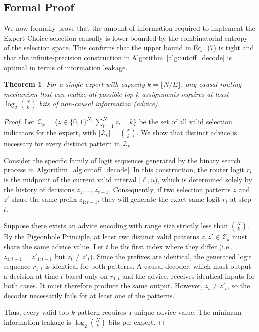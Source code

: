 \documentclass{article}
\theoremstyle{plain}
\newtheorem{theorem}{Theorem}[section]
\theoremstyle{definition}
\theoremstyle{remark}
\begin{document}
\subsection{Formal Proof}

We now formally prove that the amount of information required to implement the Expert Choice selection causally is lower-bounded by the combinatorial entropy of the selection space. This confirms that the upper bound in Eq.~(7) is tight and that the infinite-precision construction in Algorithm~\ref{alg:cutoff_decode} is optimal in terms of information leakage.

\begin{theorem}
\label{thm:lower_bound}
For a single expert with capacity $k = \lfloor N/E \rfloor$, any causal routing mechanism that can realize all possible top-$k$ assignments requires at least $\log_2 \binom{N}{k}$ bits of non-causal information (advice).
\end{theorem}

\begin{proof}
Let $\mathcal{Z}_k = \{z \in \{0,1\}^N : \sum_{t=1}^N z_t = k\}$ be the set of all valid selection indicators for the expert, with $|\mathcal{Z}_k| = \binom{N}{k}$. We show that distinct advice is necessary for every distinct pattern in $\mathcal{Z}_k$.

Consider the specific family of logit sequences generated by the binary search process in Algorithm~\ref{alg:cutoff_decode}. In this construction, the router logit $r_t$ is the midpoint of the current valid interval $[\ell, u)$, which is determined solely by the history of decisions $z_1, \dots, z_{t-1}$. Consequently, if two selection patterns $z$ and $z'$ share the same prefix $z_{1:t-1}$, they will generate the exact same logit $r_t$ at step $t$.

Suppose there exists an advice encoding with range size strictly less than $\binom{N}{k}$. By the Pigeonhole Principle, at least two distinct valid patterns $z, z' \in \mathcal{Z}_k$ must share the same advice value. Let $t$ be the first index where they differ (i.e., $z_{1:t-1} = z'_{1:t-1}$ but $z_t \neq z'_t$).
Since the prefixes are identical, the generated logit sequence $r_{1:t}$ is identical for both patterns. A causal decoder, which must output a decision at time $t$ based only on $r_{1:t}$ and the advice, receives identical inputs for both cases. It must therefore produce the same output. However, $z_t \neq z'_t$, so the decoder necessarily fails for at least one of the patterns.

Thus, every valid top-$k$ pattern requires a unique advice value. The minimum information leakage is $\log_2 \binom{N}{k}$ bits per expert.
\end{proof}
\end{document}
